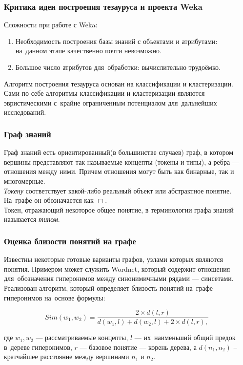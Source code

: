 \documentclass{beamer}
\begin{document}
\begin{frame}
\frametitle{Критика идеи построения тезауруса и проекта Weka}

Сложности при работе с Weka:
\begin{enumerate}
\item{Необходимость построения базы знаний  с объектами и атрибутами: на~данном этапе качественно почти невозможно.}
\item{Большое число атрибутов для~обработки: вычислительно трудоёмко.}
\end{enumerate}
\vspace{0.7cm}
Алгоритм построения тезауруса основан на классификации и кластеризации.
Сами по себе алгоритмы классификации и кластеризации являются эвристическими с~крайне ограниченным потенциалом для~дальнейших исследований.

\end{frame}

\begin{frame}
\frametitle{Граф знаний}
Граф знаний есть ориентированный(в большинстве случаев) граф, в котором вершины представляют так называемые концепты (токены и типы),
а ребра --- отношения между ними.
Причем отношения могут быть как бинарные, так и многомерные.\\ 
\vspace{0.5cm}
\textsl{Токену} соответствует какой-либо реальный объект или абстрактное понятие.
 На~графе он обозначается как $\Box$. \\
\vspace{0.5cm}
Токен, отражающий некоторое общее понятие, в терминологии графа знаний называется \textsl{типом}.\\
\end{frame}

\begin{frame}
\frametitle{Оценка близости понятий на графе}

Известны некоторые готовые варианты графов, узлами которых являются понятия.
Примером может служить Wordnet, который содержит отношения для~обозначения гиперонимов 
между синонимичными рядами --- синсетами.\\
\vspace{0.3cm}
Реализован алгоритм, который определяет близость понятий на~графе гиперонимов на~основе формулы:

$$ Sim(w_1, w_2) = \frac{ 2\times d(l, r) }
	               { d(w_1, l) + d(w_2, l) + 2\times d(l,r), }$$

где $w_1,w_2$ --- рассматриваемые концепты, 
$l$ --- их~наименьший общий предок в~дереве гиперонимов,
$r$ --- базовое понятие --- корень дерева, 
а $d(n_1,n_2)$ -- 
кратчайшее расстояние между вершинами $n_1$ и $n_2$.

\end{frame}
\end{document}
